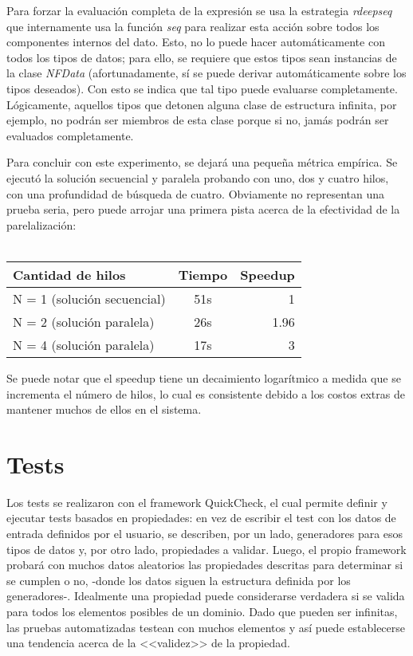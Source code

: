 \documentclass{llncs}
\begin{document}
Para forzar la evaluación completa de la expresión se usa la estrategia \textit{rdeepseq} que internamente usa la función \textit{seq} para realizar esta acción sobre todos los componentes internos del dato. Esto, no lo puede hacer automáticamente con todos los tipos de datos; para ello, se requiere que estos tipos sean instancias de la clase \textit{NFData} (afortunadamente, sí se puede derivar automáticamente sobre los tipos deseados). Con esto se indica que tal tipo puede evaluarse completamente. Lógicamente, aquellos tipos que detonen alguna clase de estructura infinita, por ejemplo, no podrán ser miembros de esta clase porque si no, jamás podrán ser evaluados completamente.

Para concluir con este experimento, se dejará una pequeña métrica empírica. Se ejecutó la solución secuencial y paralela probando con uno, dos y cuatro hilos, con una profundidad de búsqueda de cuatro. Obviamente no representan una prueba seria, pero puede arrojar una primera pista acerca de la efectividad de la parelalización:
\\\

\setlength{\tabcolsep}{20pt}
\begin{tabular}{ l | c | r }
  Cantidad de hilos & Tiempo & Speedup \\
  \hline
  N = 1 (solución secuencial) & 51s & 1\\
  N = 2 (solución paralela)   & 26s & 1.96\\
  N = 4 (solución paralela)   & 17s & 3
\end{tabular}
\newline

Se puede notar que el speedup tiene un decaimiento logarítmico a medida que se incrementa el número de hilos, lo cual es consistente debido a los costos extras de mantener muchos de ellos en el sistema.


\section{Tests}

Los tests se realizaron con el framework QuickCheck, el cual permite definir y ejecutar tests basados en propiedades: en vez de escribir el test con los datos de entrada definidos por el usuario, se describen, por un lado, generadores para esos tipos de datos y, por otro lado, propiedades a validar. Luego, el propio framework probará con muchos datos aleatorios las propiedades descritas para determinar si se cumplen o no, -donde los datos siguen la estructura definida por los generadores-. Idealmente una propiedad puede considerarse verdadera si se valida para todos los elementos posibles de un dominio. Dado que pueden ser infinitas, las pruebas automatizadas testean con muchos elementos y así puede establecerse una tendencia acerca de la <<validez>> de la propiedad.
\end{document}
